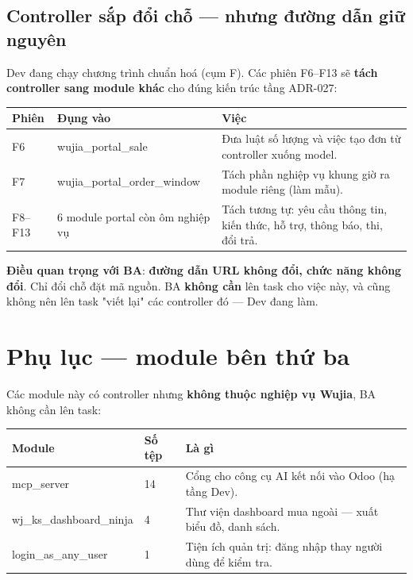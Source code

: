 \documentclass[11pt,a4paper]{report}
\newcommand{\rt}[1]{{\ttfamily\footnotesize #1}}
\begin{document}
\section{Controller sắp đổi chỗ --- nhưng đường dẫn giữ nguyên}

Dev đang chạy chương trình chuẩn hoá (cụm F). Các phiên F6–F13 sẽ \textbf{tách controller sang
module khác} cho đúng kiến trúc tầng ADR-027:

\begin{center}
\small
\begin{tabular}{@{}llL{7.2cm}@{}}
\toprule
\textbf{Phiên} & \textbf{Đụng vào} & \textbf{Việc} \\
\midrule
F6 & \rt{wujia\_portal\_sale} & Đưa luật số lượng và việc tạo đơn từ controller xuống model. \\
F7 & \rt{wujia\_portal\_order\_window} & Tách phần nghiệp vụ khung giờ ra module riêng (làm mẫu). \\
F8–F13 & 6 module portal còn ôm nghiệp vụ & Tách tương tự: yêu cầu thông tin, kiến thức, hỗ trợ, thông báo, thi, đổi trả. \\
\bottomrule
\end{tabular}
\end{center}

\textbf{Điều quan trọng với BA}: \textbf{đường dẫn URL không đổi, chức năng không đổi}. Chỉ
đổi chỗ đặt mã nguồn. BA \textbf{không cần} lên task cho việc này, và cũng không nên lên task
"viết lại" các controller đó — Dev đang làm.

\appendix
\chapter{Phụ lục --- module bên thứ ba}

Các module này có controller nhưng \textbf{không thuộc nghiệp vụ Wujia}, BA không cần lên task:

\begin{center}
\small
\begin{tabular}{@{}llL{8.4cm}@{}}
\toprule
\textbf{Module} & \textbf{Số tệp} & \textbf{Là gì} \\
\midrule
\rt{mcp\_server} & 14 & Cổng cho công cụ AI kết nối vào Odoo (hạ tầng Dev). \\
\rt{wj\_ks\_dashboard\_ninja} & 4 & Thư viện dashboard mua ngoài — xuất biểu đồ, danh sách. \\
\rt{login\_as\_any\_user} & 1 & Tiện ích quản trị: đăng nhập thay người dùng để kiểm tra. \\
\bottomrule
\end{tabular}
\end{center}
\end{document}
